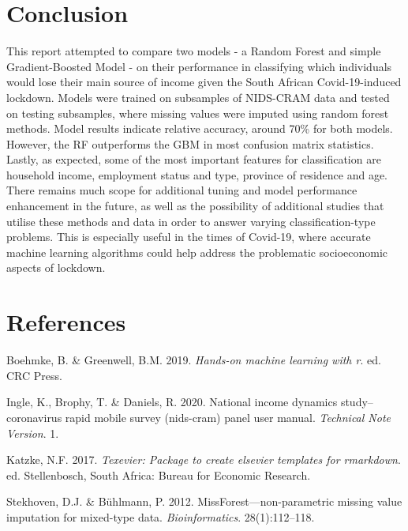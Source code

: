 \documentclass[11pt,preprint, authoryear]{elsarticle}
\numberwithin{equation}{section}
\numberwithin{figure}{section}
\numberwithin{table}{section}
\begin{document}
\hypertarget{conclusion}{%
\section{Conclusion}\label{conclusion}}

This report attempted to compare two models - a Random Forest and simple
Gradient-Boosted Model - on their performance in classifying which
individuals would lose their main source of income given the South
African Covid-19-induced lockdown. Models were trained on subsamples of
NIDS-CRAM data and tested on testing subsamples, where missing values
were imputed using random forest methods. Model results indicate
relative accuracy, around 70\% for both models. However, the RF
outperforms the GBM in most confusion matrix statistics. Lastly, as
expected, some of the most important features for classification are
household income, employment status and type, province of residence and
age. There remains much scope for additional tuning and model
performance enhancement in the future, as well as the possibility of
additional studies that utilise these methods and data in order to
answer varying classification-type problems. This is especially useful
in the times of Covid-19, where accurate machine learning algorithms
could help address the problematic socioeconomic aspects of lockdown.

\newpage

\hypertarget{references}{%
\section*{References}\label{references}}

\hypertarget{refs}{}
\leavevmode\hypertarget{ref-boehmke}{}%
Boehmke, B. \& Greenwell, B.M. 2019. \emph{Hands-on machine learning
with r}. ed. CRC Press.

\leavevmode\hypertarget{ref-nids2020}{}%
Ingle, K., Brophy, T. \& Daniels, R. 2020. National income dynamics
study--coronavirus rapid mobile survey (nids-cram) panel user manual.
\emph{Technical Note Version}. 1.

\leavevmode\hypertarget{ref-Texevier}{}%
Katzke, N.F. 2017. \emph{Texevier: Package to create elsevier templates
for rmarkdown}. ed. Stellenbosch, South Africa: Bureau for Economic
Research.

\leavevmode\hypertarget{ref-stekhoven2012missforest}{}%
Stekhoven, D.J. \& Bühlmann, P. 2012. MissForest---non-parametric
missing value imputation for mixed-type data. \emph{Bioinformatics}.
28(1):112--118.
\end{document}
